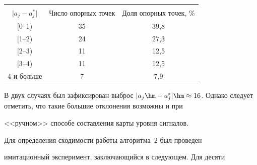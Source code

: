 \begin{table}\small

\begin{center}



\parbox{275pt}{



}

\vspace*{2ex}



\begin{tabular}{|c|c|c|}

\hline

&&\\[-9pt]

$\vert a_j-a_j^*\vert$&Число опорных точек&

Доля опорных точек, \%\\[3pt]

\hline

$[$0--1)&35&39,8\\

$[$1--2)&24&27,3\\

$[$2--3)&11&12,5\\

$[$3--4)&11&12,5\\

4 и больше&\hphantom{9}7&\hphantom{9}7,9\\

\hline

\end{tabular}

\end{center}

\end{table}





 В двух случаях был зафиксирован выброс $\vert a_j\hm- a_j^*\vert \hm\approx

16$. Однако следует отметить, что такие большие отклонения возможны и при

<<ручном>> способе составления карты уровня сигналов.



 Для определения сходимости работы алгоритма~2 был проведен

имитационный эксперимент, заключающийся в следующем. Для десяти


